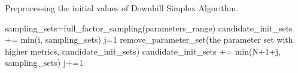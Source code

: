 \documentclass[gmd, manuscript]{copernicus}
\begin{document}




\begin{algorithm}[htb]
\caption{Preprocessing the initial values of Downhill Simplex Algorithm.} 
\label{alg:sequential-operation}
\begin{algorithmic}
\STATE sampling\_sets=full\_factor\_sampling(parameters\_range)
\STATE candidate\_init\_sets += min(i, sampling\_sets)
\ENDFOR
{}
\STATE j=1
\STATE remove\_parameter\_set(the parameter set with higher metrics, candidate\_init\_sets)
\STATE candidate\_init\_sets += min(N+1+j, sampling\_sets)
\STATE j+=1
\ENDWHILE
\end{algorithmic}
\end{algorithm}








\end{document}
